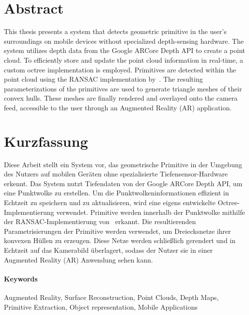 
\section*{Abstract}
This thesis presents a system that detects geometric primitive in the user's surroundings on mobile devices without specialized depth-sensing hardware.
The system utilizes depth data from the Google ARCore Depth API to create a point cloud.
To efficiently store and update the point cloud information in real-time, a custom octree implementation is employed.
Primitives are detected within the point cloud using the RANSAC implementation by~\cite{schnabel_efficient_2007}.
The resulting parameterizations of the primitives are used to generate triangle meshes of their convex hulls.
These meshes are finally rendered and overlayed onto the camera feed, accessible to the user through an
Augmented Reality (AR) application.

\section*{Kurzfassung}
Diese Arbeit stellt ein System vor, das geometrische Primitive in der Umgebung des Nutzers auf mobilen Geräten ohne spezialisierte Tiefensensor-Hardware erkennt.
Das System nutzt Tiefendaten von der Google ARCore Depth API, um eine Punktwolke zu erstellen.
Um die Punktwolkeninformationen effizient in Echtzeit zu speichern und zu aktualisieren,
wird eine eigens entwickelte Octree-Implementierung verwendet.
Primitive werden innerhalb der Punktwolke mithilfe der RANSAC-Implementierung von~\cite{schnabel_efficient_2007} erkannt.
Die resultierenden Parametrisierungen der Primitive werden verwendet, um Dreiecksnetze ihrer konvexen Hüllen zu erzeugen.
Diese Netze werden schließlich gerendert und in Echtzeit auf das Kamerabild überlagert,
sodass der Nutzer sie in einer Augmented Reality (AR) Anwendung sehen kann.



\paragraph*{Keywords}
Augmented Reality, Surface Reconstruction, Point Clouds, Depth Maps, Primitive Extraction, Object representation, Mobile Applications

%

